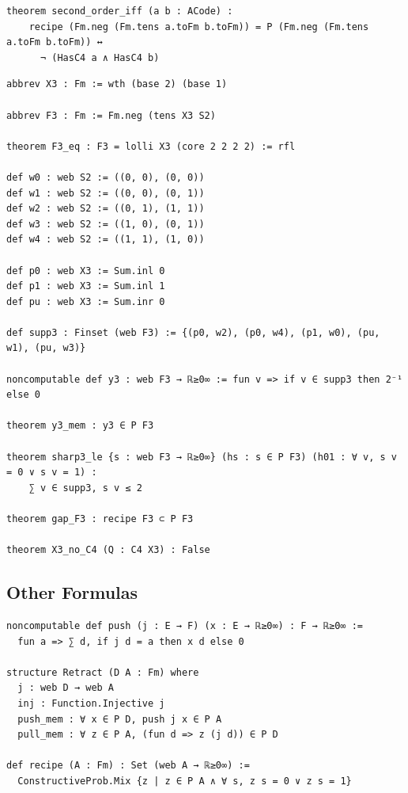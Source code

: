 \label{lean:second-iff}
\begin{lstlisting}
theorem second_order_iff (a b : ACode) :
    recipe (Fm.neg (Fm.tens a.toFm b.toFm)) = P (Fm.neg (Fm.tens a.toFm b.toFm)) ↔
      ¬ (HasC4 a ∧ HasC4 b)
\end{lstlisting}

\label{lean:gap-f3}
\begin{lstlisting}
abbrev X3 : Fm := wth (base 2) (base 1)

abbrev F3 : Fm := Fm.neg (tens X3 S2)

theorem F3_eq : F3 = lolli X3 (core 2 2 2 2) := rfl

def w0 : web S2 := ((0, 0), (0, 0))
def w1 : web S2 := ((0, 0), (0, 1))
def w2 : web S2 := ((0, 1), (1, 1))
def w3 : web S2 := ((1, 0), (0, 1))
def w4 : web S2 := ((1, 1), (1, 0))

def p0 : web X3 := Sum.inl 0
def p1 : web X3 := Sum.inl 1
def pu : web X3 := Sum.inr 0

def supp3 : Finset (web F3) := {(p0, w2), (p0, w4), (p1, w0), (pu, w1), (pu, w3)}

noncomputable def y3 : web F3 → ℝ≥0∞ := fun v => if v ∈ supp3 then 2⁻¹ else 0

theorem y3_mem : y3 ∈ P F3

theorem sharp3_le {s : web F3 → ℝ≥0∞} (hs : s ∈ P F3) (h01 : ∀ v, s v = 0 ∨ s v = 1) :
    ∑ v ∈ supp3, s v ≤ 2

theorem gap_F3 : recipe F3 ⊂ P F3

theorem X3_no_C4 (Q : C4 X3) : False
\end{lstlisting}

\subsection{Other Formulas}

\label{lean:retract}
\begin{lstlisting}
noncomputable def push (j : E → F) (x : E → ℝ≥0∞) : F → ℝ≥0∞ :=
  fun a => ∑ d, if j d = a then x d else 0

structure Retract (D A : Fm) where
  j : web D → web A
  inj : Function.Injective j
  push_mem : ∀ x ∈ P D, push j x ∈ P A
  pull_mem : ∀ z ∈ P A, (fun d => z (j d)) ∈ P D

def recipe (A : Fm) : Set (web A → ℝ≥0∞) :=
  ConstructiveProb.Mix {z | z ∈ P A ∧ ∀ s, z s = 0 ∨ z s = 1}
\end{lstlisting}

